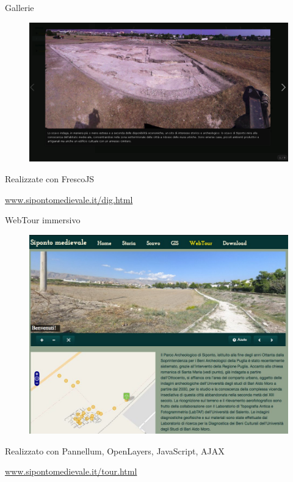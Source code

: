 \documentclass{beamer}
\begin{document}
		\begin{frame}{Gallerie}
			\begin{figure}[]
				\begin{center}
					\includegraphics[width=1\linewidth]{gallery}
				\end{center}
				\label{fig:gallery}
			\end{figure}
			Realizzate con FrescoJS\\
			\centering
			\begin{center}\url{www.sipontomedievale.it/dig.html}\end{center}
		\end{frame}

		\begin{frame}{WebTour immersivo}
			\begin{figure}[]
				\begin{center}
					\includegraphics[width=0.75\linewidth]{screen_tour}
				\end{center}
				\label{fig:gallery}
			\end{figure}
			Realizzato con Pannellum, OpenLayers, JavaScript, AJAX\\
			\centering
			\begin{center}\url{www.sipontomedievale.it/tour.html}\end{center}
		\end{frame}
\end{document}
